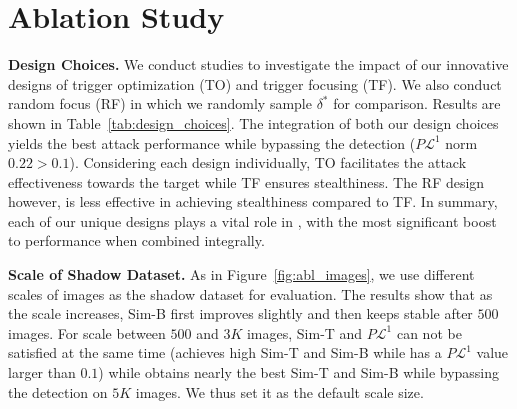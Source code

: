 \section{Ablation Study}
\label{appendix:ablation}
\textbf{Design Choices.} We conduct studies to investigate the impact of our innovative designs of trigger optimization (TO) and trigger focusing (TF). We also conduct random focus (RF) in which we randomly sample $\delta^*$ for comparison. Results are shown in Table~\ref{tab:design_choices}. The integration of both our design choices yields the best attack performance while bypassing the detection ($P\mathcal{L}^1$ norm $0.22 > 0.1$). Considering each design individually, TO facilitates the attack effectiveness towards the target while TF ensures stealthiness. The RF design however, is less effective in achieving stealthiness compared to TF. In summary, each of our unique designs plays a vital role in \project, with the most significant boost to performance when combined integrally.
\begin{table}[h]
    \centering
    \caption{Ablation study on different design choices.}
    \label{tab:design_choices}
\end{table}

\noindent\textbf{Scale of Shadow Dataset.} As in Figure~\ref{fig:abl_images}, we use different scales of images as the shadow dataset for evaluation. The results show that as the scale increases, Sim-B first improves slightly and then keeps stable after $500$ images. For scale between $500$ and $3K$ images, Sim-T and $P\mathcal{L}^1$ can not be satisfied at the same time (achieves high Sim-T and Sim-B while has a $P\mathcal{L}^1$ value larger than $0.1$) while \project obtains nearly the best Sim-T and Sim-B while bypassing the detection on $5K$ images. We thus set it as the default scale size.

